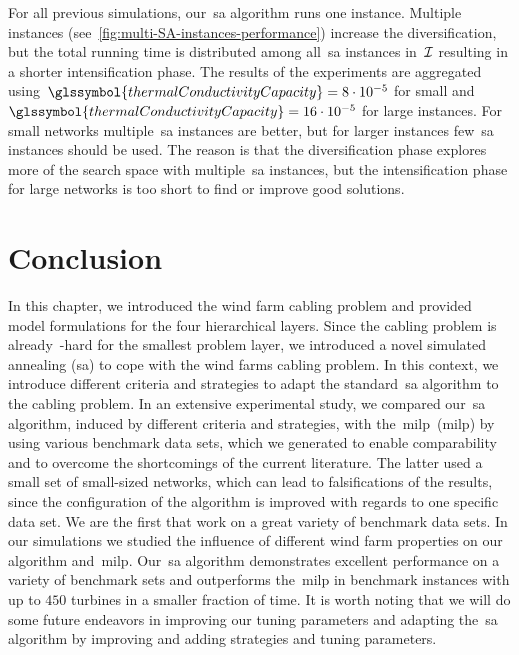For all previous simulations, our~\gls{sa} algorithm runs one instance. Multiple
instances (see~\cref{fig:multi-SA-instances-performance}) increase the
diversification, but the total running time is distributed among all~\gls{sa}
instances in~$\mathcal{I}$ resulting in a shorter intensification phase. The
results of the experiments are aggregated
using~$\glssymbol{thermalConductivityCapacity}=8\cdot 10^{-5}$ for small
and~$\glssymbol{thermalConductivityCapacity}=16\cdot 10^{-5}$ for large
instances. For small networks multiple~\gls{sa} instances are better, but for
larger instances few~\gls{sa} instances should be used. The reason is that the
diversification phase explores more of the search space with multiple~\gls{sa}
instances, but the intensification phase for large networks is too short to find
or improve good solutions.
%
\section{Conclusion}    
\label{ch:wfcp:sec:conclusion}
%
In this chapter, we introduced the wind farm cabling problem and provided model
formulations for the four hierarchical layers. Since the cabling problem is
already~\NP-hard for the smallest problem layer, we introduced a novel simulated
annealing (\gls{sa}) to cope with the wind farms cabling problem. In this
context, we introduce different criteria and strategies to adapt the
standard~\gls{sa} algorithm to the cabling problem. In an extensive experimental
study, we compared our~\gls{sa} algorithm, induced by different criteria and
strategies, with the~\acrlong{milp}~(\gls{milp}) by using various benchmark data
sets, which we generated to enable comparability and to overcome the
shortcomings of the current literature. The latter used a small set of
small-sized networks, which can lead to falsifications of the results, since the
configuration of the algorithm is improved with regards to one specific data
set. We are the first that work on a great variety of benchmark data sets. In
our simulations we studied the influence of different wind farm properties on
our algorithm and~\gls{milp}. Our~\gls{sa} algorithm demonstrates excellent
performance on a variety of benchmark sets and outperforms the~\gls{milp} in
benchmark instances with up to $450$ turbines in a smaller fraction of time. It
is worth noting that we will do some future endeavors in improving our tuning
parameters and adapting the~\gls{sa} algorithm by improving and adding
strategies and tuning parameters.
